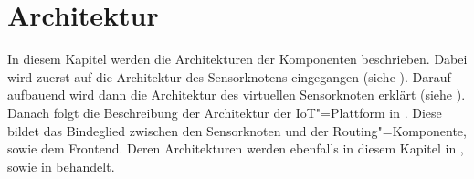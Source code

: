 \chapter{Architektur}
In diesem Kapitel werden die Architekturen der Komponenten beschrieben.
Dabei wird zuerst auf die Architektur des Sensorknotens eingegangen (siehe ).
Darauf aufbauend wird dann die Architektur des virtuellen Sensorknoten erklärt (siehe ).
Danach folgt die Beschreibung der Architektur der IoT"=Plattform in .
Diese bildet das Bindeglied zwischen den Sensorknoten und der Routing"=Komponente, sowie dem Frontend.
Deren Architekturen werden ebenfalls in diesem Kapitel in , sowie in   behandelt.

















